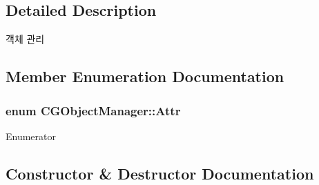 \subsection{Detailed Description}

\begin{DoxyItemize}
\item 객체 관리 
\end{DoxyItemize}

\subsection{Member Enumeration Documentation}
\hypertarget{class_c_g_object_manager_aae1239b4b634d4ae811f873284504553}{}
\subsubsection[{Attr}]{\setlength{\rightskip}{0pt plus 5cm}enum {\bf C\+G\+Object\+Manager\+::\+Attr}}\label{class_c_g_object_manager_aae1239b4b634d4ae811f873284504553}
\begin{Desc}
\item[Enumerator]\par
\begin{description}
\item[{\em 
\hypertarget{class_c_g_object_manager_aae1239b4b634d4ae811f873284504553a358161e50130f826052028e4ec8da50e}{}e\+Attr\+Display\+Only\+Text\+Outline\label{class_c_g_object_manager_aae1239b4b634d4ae811f873284504553a358161e50130f826052028e4ec8da50e}
}]\end{description}
\end{Desc}


\subsection{Constructor \& Destructor Documentation}
\hypertarget{class_c_g_object_manager_a8e1eb3b5a73ef8b1aea4fb1e7c380367}{}

